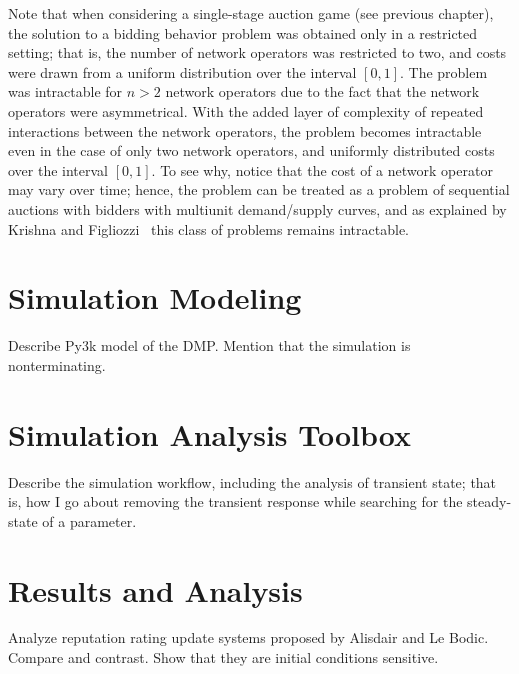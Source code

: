 Note that when considering a single-stage auction game (see previous chapter), the solution to a bidding behavior problem was obtained only in a restricted setting; that is, the number of network operators was restricted to two, and costs were drawn from a uniform distribution over the interval $[0,1]$. The problem was intractable for $n>2$ network operators due to the fact that the network operators were asymmetrical. With the added layer of complexity of repeated interactions between the network operators, the problem becomes intractable even in the case of only two network operators, and uniformly distributed costs over the interval $[0,1]$. To see why, notice that the cost of a network operator may vary over time; hence, the problem can be treated as a problem of sequential auctions with bidders with multiunit demand/supply curves, and as explained by Krishna\cite{Krishna10} and Figliozzi~\cite{FigliozziJaillet2008} this class of problems remains intractable.

\section{Simulation Modeling} %
\label{sec:simulation_modeling_dynamic}
Describe Py3k model of the DMP. Mention that the simulation is nonterminating.

\section{Simulation Analysis Toolbox} %
\label{sec:simulation_analysis_toolbox_dynamic}
Describe the simulation workflow, including the analysis of transient state; that is, how I go about removing the transient response while searching for the steady-state of a parameter.

\section{Results and Analysis} %
\label{sec:results_and_analysis_dynamic}
Analyze reputation rating update systems proposed by Alisdair and Le Bodic. Compare and contrast. Show that they are initial conditions sensitive.
